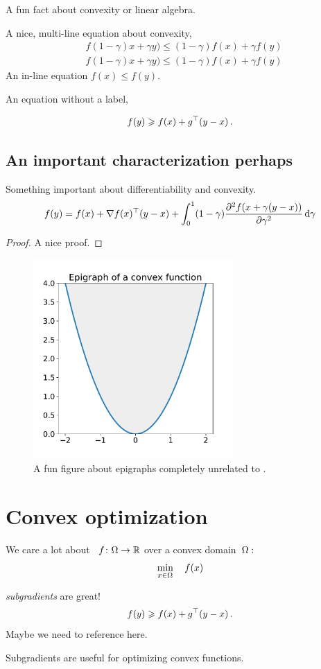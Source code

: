 \documentclass[12pt]{article}
\begin{document}
\begin{fact}
A fun fact about convexity or linear algebra.
\end{fact}

A nice, multi-line equation about convexity,
\begin{align}
& f(1-\gamma)x+\gamma y) \le (1-\gamma)f(x)+\gamma f(y) \\
& f(1-\gamma)x+\gamma y) \le (1-\gamma)f(x)+\gamma f(y)
\end{align}
An in-line equation $f(x) \le f(y)$.

An equation without a label,

\[
f(y) \geqslant f(x) + g^\top (y-x)\,.
\]

\subsection{An important characterization perhaps}
\begin{proposition}
Something important about differentiability and convexity.
\[
f(y) = f(x)
+ \nabla f(x)^\top (y-x)
+ \int_0^1 (1-\gamma)\frac{\partial^2 f(x+\gamma(y-x))}{\partial\gamma^2}\,\mathrm{d}\gamma
\]
\end{proposition}
\begin{proof}
A nice proof.
\end{proof}

\begin{figure}[!ht]
\begin{center}
\includegraphics[width=3in]{figures/lecture1-epigraph}
\end{center}
\caption{A fun figure about epigraphs completely unrelated to .}
\end{figure}

\section{Convex optimization}
We care a lot about ~$f\colon\Omega\to\mathbb{R}$ over a convex domain~$\Omega:$
\[
\min_{x\in\Omega}\quad f(x)
\]

\begin{remark}[Subgradients]
\emph{subgradients} are great!
\[
f(y) \geqslant f(x) + g^\top (y-x)\,.
\]
Maybe we need to reference  here.
\end{remark}

Subgradients are useful for optimizing convex functions.




\end{document}
